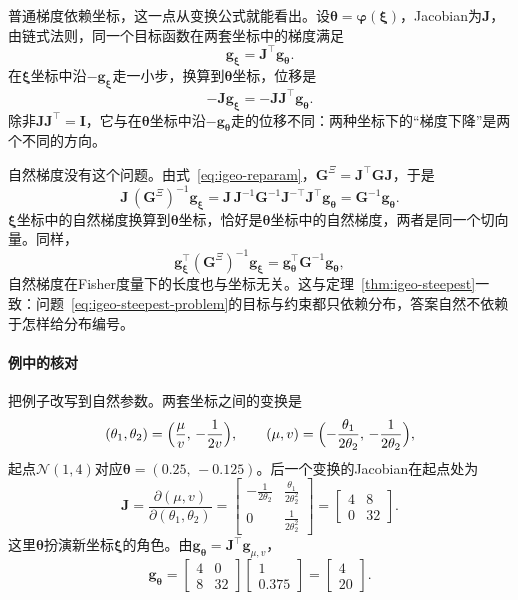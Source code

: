 普通梯度依赖坐标，这一点从变换公式就能看出。设$\bm{\theta}=\bm{\varphi}(\bm{\xi})$，Jacobian为$\bm{J}$，由链式法则，同一个目标函数在两套坐标中的梯度满足
\[
  \bm{g}_{\bm{\xi}}=\bm{J}^{\top}\bm{g}_{\bm{\theta}} .
\]
在$\bm{\xi}$坐标中沿$-\bm{g}_{\bm{\xi}}$走一小步，换算到$\bm{\theta}$坐标，位移是
\[
  -\bm{J}\bm{g}_{\bm{\xi}}=-\bm{J}\bm{J}^{\top}\bm{g}_{\bm{\theta}} .
\]
除非$\bm{J}\bm{J}^{\top}=\bm{I}$，它与在$\bm{\theta}$坐标中沿$-\bm{g}_{\bm{\theta}}$走的位移不同：两种坐标下的“梯度下降”是两个不同的方向。

自然梯度没有这个问题。由式~\eqref{eq:igeo-reparam}，$\bm{G}^{\Xi}=\bm{J}^{\top}\bm{G}\bm{J}$，于是
\begin{equation}
  \bm{J}\,(\bm{G}^{\Xi})^{-1}\bm{g}_{\bm{\xi}}=\bm{J}\,\bm{J}^{-1}\bm{G}^{-1}\bm{J}^{-\top}\bm{J}^{\top}\bm{g}_{\bm{\theta}}=\bm{G}^{-1}\bm{g}_{\bm{\theta}} .
  \label{eq:igeo-natural-invariance}
\end{equation}
$\bm{\xi}$坐标中的自然梯度换算到$\bm{\theta}$坐标，恰好是$\bm{\theta}$坐标中的自然梯度，两者是同一个切向量。同样，
\[
  \bm{g}_{\bm{\xi}}^{\top}(\bm{G}^{\Xi})^{-1}\bm{g}_{\bm{\xi}}=\bm{g}_{\bm{\theta}}^{\top}\bm{G}^{-1}\bm{g}_{\bm{\theta}},
\]
自然梯度在Fisher度量下的长度也与坐标无关。这与定理~\ref{thm:igeo-steepest}一致：问题~\eqref{eq:igeo-steepest-problem}的目标与约束都只依赖分布，答案自然不依赖于怎样给分布编号。

\paragraph{例中的核对}
把例子改写到自然参数。两套坐标之间的变换是
\[
  (\theta_1,\theta_2)=\Bigl(\frac{\mu}{v},\,-\frac{1}{2v}\Bigr),\qquad(\mu,v)=\Bigl(-\frac{\theta_1}{2\theta_2},\,-\frac{1}{2\theta_2}\Bigr),
\]
起点$\mathcal{N}(1,4)$对应$\bm{\theta}=(0.25,\,-0.125)$。后一个变换的Jacobian在起点处为
\[
  \bm{J}=\frac{\partial(\mu,v)}{\partial(\theta_1,\theta_2)}=\begin{bmatrix}-\frac{1}{2\theta_2}&\frac{\theta_1}{2\theta_2^{2}}\\0&\frac{1}{2\theta_2^{2}}\end{bmatrix}=\begin{bmatrix}4&8\\0&32\end{bmatrix}.
\]
这里$\bm{\theta}$扮演新坐标$\bm{\xi}$的角色。由$\bm{g}_{\bm{\theta}}=\bm{J}^{\top}\bm{g}_{\mu,v}$，
\[
  \bm{g}_{\bm{\theta}}=\begin{bmatrix}4&0\\8&32\end{bmatrix}\begin{bmatrix}1\\0.375\end{bmatrix}=\begin{bmatrix}4\\20\end{bmatrix}.
\]

